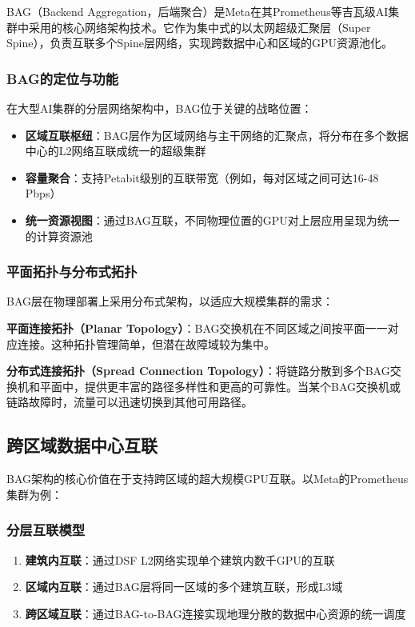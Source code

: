 BAG（Backend Aggregation，后端聚合）是Meta在其Prometheus等吉瓦级AI集群中采用的核心网络架构技术。它作为集中式的以太网超级汇聚层（Super Spine），负责互联多个Spine层网络，实现跨数据中心和区域的GPU资源池化。

\subsubsection{BAG的定位与功能}

在大型AI集群的分层网络架构中，BAG位于关键的战略位置：

\begin{itemize}
    \item \textbf{区域互联枢纽}：BAG层作为区域网络与主干网络的汇聚点，将分布在多个数据中心的L2网络互联成统一的超级集群
    \item \textbf{容量聚合}：支持Petabit级别的互联带宽（例如，每对区域之间可达16-48 Pbps）
    \item \textbf{统一资源视图}：通过BAG互联，不同物理位置的GPU对上层应用呈现为统一的计算资源池
\end{itemize}

\subsubsection{平面拓扑与分布式拓扑}

BAG层在物理部署上采用分布式架构，以适应大规模集群的需求：

\textbf{平面连接拓扑（Planar Topology）}：BAG交换机在不同区域之间按平面一一对应连接。这种拓扑管理简单，但潜在故障域较为集中。

\textbf{分布式连接拓扑（Spread Connection Topology）}：将链路分散到多个BAG交换机和平面中，提供更丰富的路径多样性和更高的可靠性。当某个BAG交换机或链路故障时，流量可以迅速切换到其他可用路径。

\subsection{跨区域数据中心互联}

BAG架构的核心价值在于支持跨区域的超大规模GPU互联。以Meta的Prometheus集群为例：

\subsubsection{分层互联模型}

\begin{enumerate}
    \item \textbf{建筑内互联}：通过DSF L2网络实现单个建筑内数千GPU的互联
    \item \textbf{区域内互联}：通过BAG层将同一区域的多个建筑互联，形成L3域
    \item \textbf{跨区域互联}：通过BAG-to-BAG连接实现地理分散的数据中心资源的统一调度
\end{enumerate}

